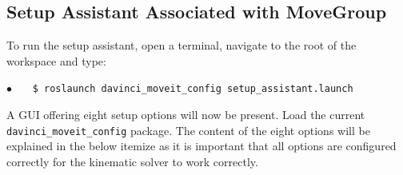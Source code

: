 \subsection{Setup Assistant Associated with MoveGroup}\label{app:setup_assist}
To run the setup assistant, open a terminal, navigate to the root of the workspace and type:

\hspace{1cm} \textbf{$\bullet$} \ \ \  \texttt{\$ roslaunch davinci\_moveit\_config setup\_assistant.launch} \ \ \ {} 

A GUI offering eight setup options will now be present. Load the current \texttt{davinci\_moveit\_config} package. The content of the eight options will be explained in the below itemize as it is important that all options are configured correctly for the kinematic solver to work correctly.
